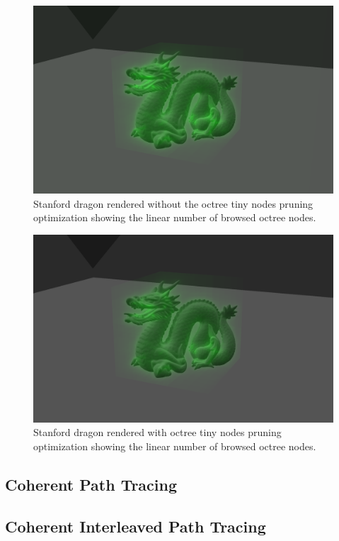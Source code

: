 \documentclass[10pt,twocolumn,a4paper]{article}
\begin{document}
\begin{figure}[h]
    \centering
    \includegraphics[width=0.8\columnwidth]{stats_octree_nodes.png}
    \caption{
        Stanford dragon rendered without the octree tiny nodes pruning optimization
        showing the linear number of browsed octree nodes.
    }
    \label{fig:stanford_dragon_without_node_pruning}
\end{figure}

\begin{figure}[h]
    \centering
    \includegraphics[width=0.8\columnwidth]{stats_octree_nodes_optimized.png}
    \caption{
        Stanford dragon rendered with octree tiny nodes pruning optimization
        showing the linear number of browsed octree nodes.
    }
    \label{fig:stanford_dragon_with_node_pruning}
\end{figure}

\subsection{Coherent Path Tracing}
\subsection{Coherent Interleaved Path Tracing}
\end{document}
